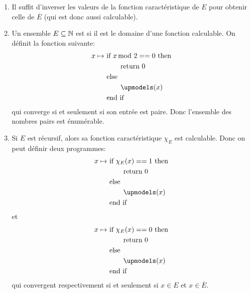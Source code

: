 {\begin{td-sol}[]
\begin{enumerate}
\begin{itemize}
\begin{align*}
								&\qquad \text{return } 1 \\
								&\text{else } \\
								&\qquad \text{return } 0\\
								&\text{end if}
				\end{align*}
			\end{itemize}
			\item Il suffit d'inverser les valeurs de la fonction caractéristique
			de \(E\) pour obtenir celle de \(\overline{E}\) (qui est donc aussi calculable).
			\item Un ensemble \(E\subseteq \mathbb{N}\) est  si
			il est le domaine d'une fonction calculable. On définit la fonction suivante:
			\begin{align*}
				x \mapsto\ & \text{if } x \hspace{-0.5em}\mod 2 == 0 \text{ then}\\
							&\qquad \text{return } 0 \\
							&\text{else } \\
							&\qquad \upmodels(x)\\
							&\text{end if}
			\end{align*}
			qui converge si et seulement si son entrée est paire.
			Donc l'ensemble des nombres pairs est énumérable.

			\item Si \(E\) est récursif, alors sa fonction caractéristique \(\chi_E\) est calculable.
			Donc on peut définir deux programmes:
			\begin{align*}
				x \mapsto\ & \text{if } \chi_E(x) == 1 \text{ then}\\
						&\qquad \text{return } 0 \\
						&\text{else } \\
						&\qquad \upmodels(x) \\
						&\text{end if}
			\end{align*}
			et
			\begin{align*}
				x \mapsto\ & \text{if } \chi_E(x) == 0 \text{ then}\\
						&\qquad \text{return } 0 \\
						&\text{else } \\
						&\qquad \upmodels(x) \\
						&\text{end if}
			\end{align*}
			qui convergent respectivement si et seulement si \(x \in E\) et \(x \in \overline{E}\).
		\end{enumerate}
	\end{td-sol}
}{}


